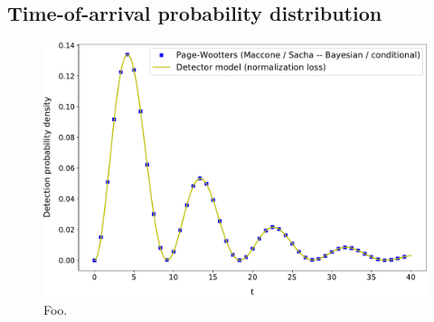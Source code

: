 
\subsection{Time-of-arrival probability distribution}

\begin{figure}[]
  \centering
  \includegraphics[width=\textwidth]{img/3ldetect/conditionalProbFit.pdf}
  \caption{Foo.}
\end{figure}